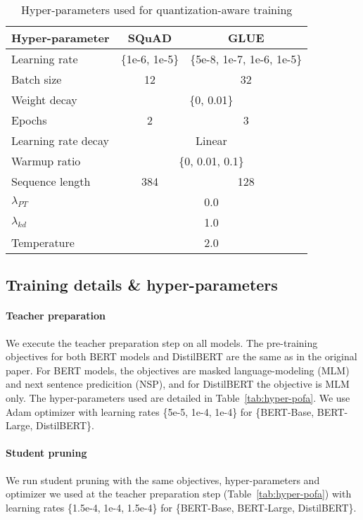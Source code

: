 \documentclass{article}
\begin{document}
\begin{table}[t]
\centering
\caption{Hyper-parameters used for quantization-aware training}
\label{tab:hyper-quant}
\begin{tabular}{@{}lcc@{}}
\toprule
Hyper-parameter & SQuAD & GLUE \\ \midrule
Learning rate & \{1e-6, 1e-5\} & \{5e-8, 1e-7, 1e-6, 1e-5\} \\
Batch size & 12 & 32 \\
Weight decay & \multicolumn{2}{c}{\{0, 0.01\}} \\
Epochs & 2 & 3 \\
Learning rate decay & \multicolumn{2}{c}{Linear} \\
Warmup ratio & \multicolumn{2}{c}{\{0, 0.01, 0.1\}} \\
Sequence length & 384 & 128 \\
$\lambda_{PT}$ & \multicolumn{2}{c}{0.0} \\
$\lambda_{kd}$ & \multicolumn{2}{c}{1.0} \\
Temperature & \multicolumn{2}{c}{2.0} \\ \bottomrule
\end{tabular}\end{table}

\subsection{Training details \& hyper-parameters}
\label{app:hyper-params}
\paragraph{Teacher preparation}
We execute the teacher preparation step on all models.
The pre-training objectives for both BERT models and DistilBERT are the same as in the original paper.
For BERT models, the objectives are masked language-modeling (MLM) and next sentence predicition (NSP), and for DistilBERT the objective is MLM only.
The hyper-parameters used are detailed in Table~\ref{tab:hyper-pofa}.
We use Adam optimizer \citep{kingma2015adam} with learning rates \{5e-5, 1e-4, 1e-4\} for \{BERT-Base, BERT-Large, DistilBERT\}.

\paragraph{Student pruning}
We run student pruning with the same objectives, hyper-parameters and optimizer we used at the teacher preparation step (Table~\ref{tab:hyper-pofa}) with learning rates \{1.5e-4, 1e-4, 1.5e-4\} for \{BERT-Base, BERT-Large, DistilBERT\}.
\end{document}
